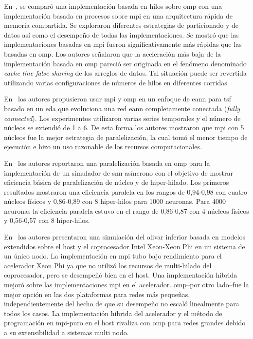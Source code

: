 {En~\cite{Strey2003ACO}, se comparó una implementación basada en hilos sobre \gls{omp} con una implementación basada en procesos sobre \gls{mpi} en una arquitectura rápida de memoria compartida.
Se exploraron diferentes estrategias de particionado y de datos así como el desempeño de todas las implementaciones.
Se mostró que las implementaciones basadas en \gls{mpi} fueron significativamente más rápidas que las basadas en \gls{omp}.
Los autores señalaron que la aceleración más baja de la implementación basada en \gls{omp} pareció ser originada en el fenómeno denominado \emph{cache line false sharing} de los arreglos de datos. Tal situación puede ser revertida utilizando varias configuraciones de números de hilos en diferentes corridas.

En~\cite{6232827} los autores propusieron usar \gls{mpi} y \gls{omp} en un enfoque de \gls{eann} para \gls{tsf} basado en un \gls{eda} que evoluciona una red \gls{eann} completamente conectada (\emph{fully connected}).
Los experimentos utilizaron varias series temporales y el número de núcleos se extendió de 1 a 6.
De esta forma los autores mostraron que \gls{mpi} con 5 núcleos fue la mejor estrategia de paralelización, la cual tomó el menor tiempo de ejecución e hizo un uso razonable de los recursos computacionales.

En~\cite{6511739} los autores reportaron una paralelización basada en \gls{omp} para la implementación de un simulador de \gls{snn} asíncrono con el objetivo de mostrar eficiencia básica de paralelización de núcleo y de hiper-hilado.
Los primeros resultados mostraron una eficiencia paralela en los rangos de 0,94-0,98 con cuatro núcleos físicos y 0,86-0,89 con 8 hiper-hilos para 1000 neuronas.
Para 4000 neuronas la eficiencia paralela estuvo en el rango de 0,86-0,87 con 4 núcleos físicos y 0,56-0,57 con 8 hiper-hilos.

En~\cite{Chatzikonstantis:2016:FID:2903150.2903477} los autores presentaron una simulación del olivar inferior basada en modelos  extendidos sobre el host y el coprocesador Intel Xeon-Xeon Phi en un sistema de un único nodo.
La implementación en \gls{mpi} tubo bajo rendimiento para el acelerador Xeon Phi ya que no utilizó los recursos de multi-hilado del coprocesador, pero se desempeñó bien en el host. 
Una implementación híbrida mejoró sobre las implementaciones \gls{mpi} en el acelerador.
\gls{omp}--por otro lado--fue la mejor opción en las dos plataformas para redes más pequeñas, independientemente del hecho de que su desempeño no escaló linealmente para todos los casos.
La implementación híbrida del acelerador y el método de programación en \gls{mpi}-puro en el host rivaliza con \gls{omp} para redes grandes debido a su extensibilidad a sistemas multi nodo.
}{
}

